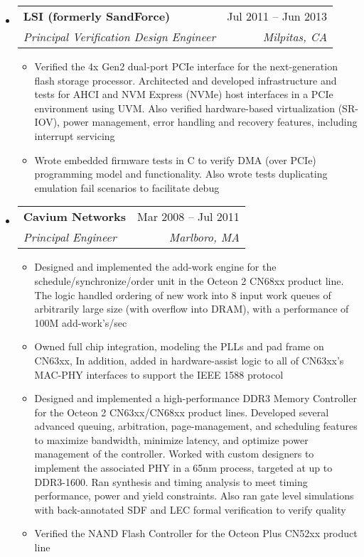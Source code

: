 \documentclass[letterpaper,12pt]{article}[leftmargin=*]
\makeatletter
\def \entryspacing {-0pt}
\newcommand{\resumeEntryStart}{\begin{itemize}[leftmargin=2.5mm]}
\newcommand{\resumeEntryEnd}{\end{itemize}\vspace{\entryspacing}}
\newcommand{\resumeItemListStart}{\begin{itemize}[leftmargin=4.5mm]}
\newcommand{\resumeItemListEnd}{\end{itemize}}
\newcommand{\resumeItem}[1]{
\item\small{
  {#1 \vspace{-2pt}}
}
}
\newcommand{\resumeEntryTSDL}[4]{
  \vspace{-1pt}\item[]
  \begin{tabularx}{0.97\textwidth}{X@{\hspace{60pt}}r}
    \textbf{\color{primary}#1} & {\firabook\color{accent}\small#2} \\
    \textit{\color{accent}\small#3} & \textit{\color{accent}\small#4} \\
  \end{tabularx}\vspace{-6pt}
}
\makeatother
\begin{document}
\resumeEntryStart
\resumeEntryTSDL
   {LSI (formerly SandForce)}{Jul 2011 -- Jun 2013}
   {Principal Verification Design Engineer}{Milpitas, CA}
   \resumeItemListStart
   \resumeItem {Verified the 4x Gen2 dual-port PCIe interface for the next-generation flash storage processor. Architected and developed infrastructure and tests for AHCI and NVM Express (NVMe) host interfaces in a PCIe environment using UVM. Also verified hardware-based virtualization (SR-IOV), power management, error handling and recovery features, including interrupt servicing}
   \resumeItem {Wrote embedded firmware tests in C to verify DMA (over PCIe) programming model and functionality. Also wrote tests duplicating emulation fail scenarios to facilitate debug}
   \resumeItemListEnd
\resumeEntryEnd

\resumeEntryStart
\resumeEntryTSDL
   {Cavium Networks}{Mar 2008 -- Jul 2011}
   {Principal Engineer}{Marlboro, MA}
   \resumeItemListStart
   \resumeItem {Designed and implemented the add-work engine for the schedule/synchronize/order unit in the Octeon 2 CN68xx product line. The logic handled ordering of new work into 8 input work queues of arbitrarily large size (with overflow into DRAM), with a performance of 100M add-work’s/sec}
   \resumeItem {Owned full chip integration, modeling the PLLs and pad frame on CN63xx, In addition, added in hardware-assist logic to all of CN63xx’s MAC-PHY interfaces to support the IEEE 1588 protocol}
   \resumeItem {Designed and implemented a high-performance DDR3 Memory Controller for the Octeon 2 CN63xx/CN68xx product lines. Developed several advanced queuing, arbitration, page-management, and scheduling features to maximize bandwidth, minimize latency, and optimize power management of the controller. Worked with custom designers to implement the associated PHY in a 65nm process, targeted at up to DDR3-1600. Ran synthesis and timing analysis to meet timing performance, power and yield constraints. Also ran gate level simulations with back-annotated SDF and LEC formal verification to verify quality}
   \resumeItem {Verified the NAND Flash Controller for the Octeon Plus CN52xx product line}
   \resumeItemListEnd
\resumeEntryEnd
\end{document}
